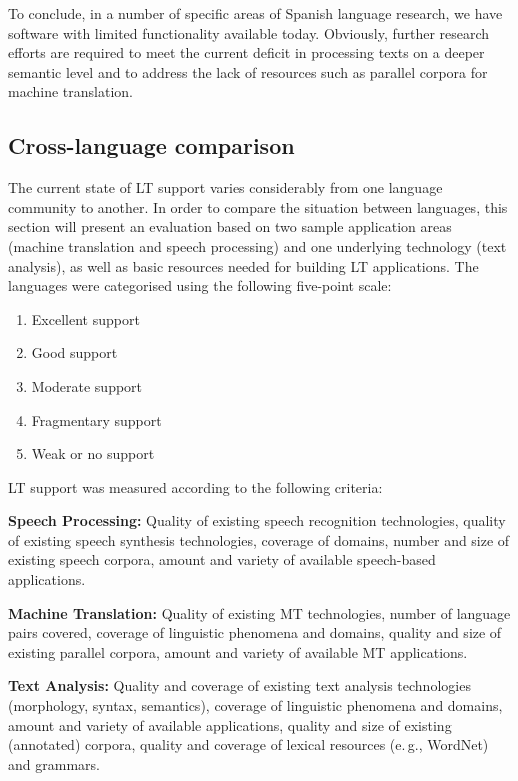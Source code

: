 \begin{multicols}{2}
To conclude, in a number of specific areas of Spanish language research, we have software with limited functionality available today. Obviously, further research efforts are required to meet the current deficit in processing texts on a deeper semantic level and to address the lack of resources such as parallel corpora for machine translation.

\subsection{Cross-language comparison}

The current state of LT support varies considerably from one language community to another. In order to compare the situation between languages, this section will present an evaluation based on two sample application areas (machine translation and speech processing) and one underlying technology (text analysis), as well as basic resources needed for building LT applications. The languages were categorised using the following five-point scale: 

\begin{enumerate}
\item Excellent support
\item Good support
\item Moderate support
\item Fragmentary support
\item Weak or no support
\end{enumerate}

LT support was measured according to the following criteria:

\textbf{Speech Processing:} Quality of existing speech recognition technologies, quality of existing speech synthesis technologies, coverage of domains, number and size of existing speech corpora, amount and variety of available speech-based applications.

\textbf{Machine Translation:} Quality of existing MT technologies, number of language pairs covered, coverage of linguistic phenomena and domains, quality and size of existing parallel corpora, amount and variety of available MT applications.

\textbf{Text Analysis:} Quality and coverage of existing text analysis technologies (morphology, syntax, semantics), coverage of linguistic phenomena and domains, amount and variety of available applications, quality and size of existing (annotated) corpora, quality and coverage of lexical resources (e.\,g., WordNet) and grammars.


\end{multicols}
